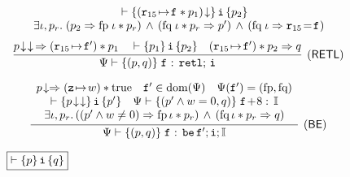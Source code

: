 \begin{figure*}[!thp]
{\begin{minipage}{1\linewidth}
\[{\begin{array}{c}
						\quad
						\wfins{\asrttm{(\regst{\reg{15}}{\lab{}} * \astP_1)}}
						{\simplins}{\astP_2}  \\
						\exists  \lgvl, \pr. \;
						\supimpl{\astP_2}{\astP'}{\specpre \; \lgvl * \pr}{\specpost \; \lgvl * \pr} \, \wedge \,
						(\specpost \; \lgvl \Rightarrow \reg{15} \!=\! \lab{})
					\end{array}	
				}
			\]
%
%
%
			\[
				\infer[(\RULE{RETL})]
				{
					\wfcblk{\astP}{\astQ}{\lab{}}{\retl; \, \simplins}
				}
				{
                    \nxtAst{\nxtAst{\astP}} \,\Rightarrow
                      (\regst\RAreg{\lab{}'}) * \astP_1
                      \quad
                    \wfins{\astP_1}{\simplins}{\astP_2}
                    \quad
					(\regst\RAreg{\lab{}'}) * \astP_2 \Rightarrow \astQ
				}
			\]

			\[
				\infer[(\RULE{BE})]
				{
					\wfcblk{\astP}{\astQ}{\lab{}}
						{\be \, \lab{}'; \simplins{}; \cblk}
				}
				{
					\begin{array}{c}
						\nxtAst{\astP} \Rightarrow
						(\regst{\regz}{\word}) \sepstar \atrue
						\quad
						\lab{}' \in \dom(\Cspec{})
						\quad
						\Cspec(\lab{}') = (\specpre, \specpost) \\
						\wfins{\nxtAst{\nxtAst{\astP}}}{\simplins{}}{\astP'}
						\quad
						\wfcblk{\astP'\land\word=0}{\astQ}{\lab{}\!+\!8}{\cblk} \\
						\exists \lgvl, \astP_r. \,
						((\astP' \land \word \neq 0) \Rightarrow
							\specpre \, \lgvl \sepstar \astP_r) \, \land \,
						(\specpost \, \lgvl \sepstar \astP_r \Rightarrow \astQ)
					\end{array}
				}
			\]
		\end{minipage}
	}
	
	\subfigure
	{
		\begin{minipage}{1\linewidth}
			$\boxed{\wfins{p}{\simplins}{q}}$ \quad \ \
			

\end{minipage}}
\end{figure*}
